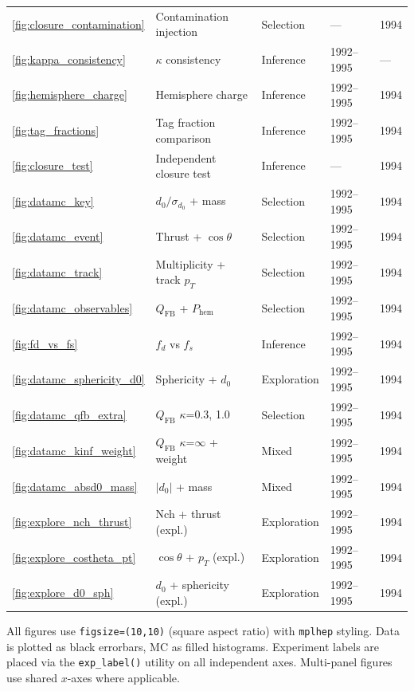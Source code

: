 \documentclass[11pt,a4paper]{article}
\begin{document}
\begin{table}[htbp]
\begin{tabular}{p{1.0cm}p{5.5cm}p{2.0cm}p{2.5cm}p{2.0cm}}
\ref{fig:closure_contamination} & Contamination injection & Selection & --- & 1994 \\
\ref{fig:kappa_consistency} & $\kappa$ consistency & Inference & 1992--1995 & --- \\
\ref{fig:hemisphere_charge} & Hemisphere charge & Inference & 1992--1995 & 1994 \\
\ref{fig:tag_fractions} & Tag fraction comparison & Inference & 1992--1995 & 1994 \\
\ref{fig:closure_test} & Independent closure test & Inference & --- & 1994 \\
\ref{fig:datamc_key} & $d_0/\sigma_{d_0}$ + mass & Selection & 1992--1995 & 1994 \\
\ref{fig:datamc_event} & Thrust + $\cos\theta$ & Selection & 1992--1995 & 1994 \\
\ref{fig:datamc_track} & Multiplicity + track $p_T$ & Selection & 1992--1995 & 1994 \\
\ref{fig:datamc_observables} & $Q_\text{FB}$ + $P_\text{hem}$ & Selection & 1992--1995 & 1994 \\
\ref{fig:fd_vs_fs} & $f_d$ vs $f_s$ & Inference & 1992--1995 & 1994 \\
\ref{fig:datamc_sphericity_d0} & Sphericity + $d_0$ & Exploration & 1992--1995 & 1994 \\
\ref{fig:datamc_qfb_extra} & $Q_\text{FB}$ $\kappa$=0.3, 1.0 & Selection & 1992--1995 & 1994 \\
\ref{fig:datamc_kinf_weight} & $Q_\text{FB}$ $\kappa$=$\infty$ + weight & Mixed & 1992--1995 & 1994 \\
\ref{fig:datamc_absd0_mass} & $|d_0|$ + mass & Mixed & 1992--1995 & 1994 \\
\ref{fig:explore_nch_thrust} & Nch + thrust (expl.) & Exploration & 1992--1995 & 1994 \\
\ref{fig:explore_costheta_pt} & $\cos\theta$ + $p_T$ (expl.) & Exploration & 1992--1995 & 1994 \\
\ref{fig:explore_d0_sph} & $d_0$ + sphericity (expl.) & Exploration & 1992--1995 & 1994 \\
\bottomrule
\end{tabular}
\end{table}

All figures use \texttt{figsize=(10,10)} (square aspect ratio)
with \texttt{mplhep} styling.
Data is plotted as black errorbars, MC as filled histograms.
Experiment labels are placed via the \texttt{exp\_label()} utility
on all independent axes.
Multi-panel figures use shared $x$-axes where applicable.
\end{document}
